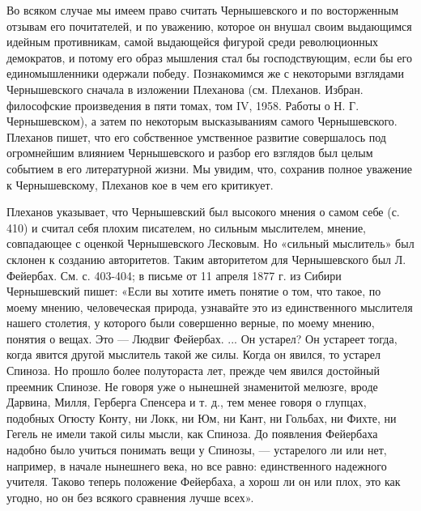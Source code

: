 Во  всяком   случае  мы  имеем   право  считать  Чернышевского   и  по
восторженным  отзывам  его  почитателей,  и по  уважению,  которое  он
внушал своим выдающимся идейным  противникам, самой выдающейся фигурой
среди  революционных  демократов, и  потому  его  образ мышления  стал
бы  господствующим,  если  бы  его  единомышленники  одержали  победу.
Познакомимся  же  с  некоторыми   взглядами  Чернышевского  сначала  в
изложении Плеханова (см. Плеханов.  Избран. философские произведения в
пяти  томах, том  IV,  1958. Работы  о Н.  Г.  Чернышевском), а  затем
по  некоторым  высказываниям  самого  Чернышевского.  Плеханов  пишет,
что его  собственное умственное  развитие совершалось  под огромнейшим
влиянием Чернышевского и разбор его  взглядов был целым событием в его
литературной  жизни.  Мы  увидим,  что,  сохранив  полное  уважение  к
Чернышевскому, Плеханов кое в чем его критикует.

Плеханов указывает, что Чернышевский был  высокого мнения о самом себе
(с.  410)  и считал  себя  плохим  писателем, но  сильным  мыслителем,
мнение,  совпадающее с  оценкой  Чернышевского  Лесковым. Но  «сильный
мыслитель» был  склонен к созданию авторитетов.  Таким авторитетом для
Чернышевского был Л.  Фейербах. См. с. 403-404; в письме  от 11 апреля
1877 г. из Сибири Чернышевский пишет:  «Если вы хотите иметь понятие о
том, что такое,  по моему мнению, человеческая  природа, узнавайте это
из единственного мыслителя нашего столетия, у которого были совершенно
верные, по моему мнению, понятия о вещах. Это --- Людвиг Фейербах. ...
Он устарел? Он устареет тогда,  когда явится другой мыслитель такой же
силы. Когда он явился, то устарел Спиноза. Но прошло более полутораста
лет, прежде  чем явился  достойный преемник Спинозе.  Не говоря  уже о
нынешней знаменитой мелюзге, вроде Дарвина, Милля, Герберга Спенсера и
т. д., тем менее говоря о  глупцах, подобных Огюсту Конту, ни Локк, ни
Юм,  ни Кант,  ни Гольбах,  ни Фихте,  ни Гегель  не имели  такой силы
мысли,  как  Спиноза.  До  появления Фейербаха  надобно  было  учиться
понимать вещи у Спинозы, --- устарелого ли или нет, например, в начале
нынешнего века, но все  равно: единственного надежного учителя. Таково
теперь положение Фейербаха, а хорош ли он или плох, это как угодно, но
он без всякого сравнения лучше всех».

